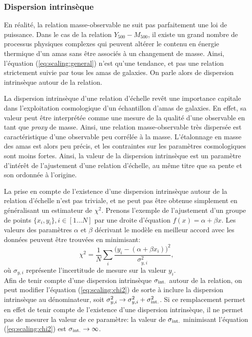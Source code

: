 \subsubsection{Dispersion intrinsèque} %
\label{sec:scaling:int_scat}

En réalité, la relation masse-observable ne suit pas parfaitement une loi de puissance.
Dans le cas de la relation $Y_{500} - M_{500}$, il existe un grand nombre de processus physiques complexes qui peuvent altérer le contenu en énergie thermique d'un amas sans être associés à un changement de masse.
Ainsi, l'équation (\ref{eq:scaling:general}) n'est qu'une tendance, et pas une relation strictement suivie par tous les amas de galaxies.
On parle alors de dispersion intrinsèque autour de la relation.

La dispersion intrinsèque d'une relation d'échelle revêt une importance capitale dans l'exploitation cosmologique d'un échantillon d'amas de galaxies.
En effet, sa valeur peut être interprétée comme une mesure de la qualité d'une observable en tant que \textit{proxy} de masse\footnotemark.
Ainsi, une relation masse-observable très dispersée est caractéristique d'une observable peu corrélée à la masse.
L'étalonnage en masse des amas est alors peu précis, et les contraintes sur les paramètres cosmologiques sont moins fortes.
Ainsi, la valeur de la dispersion intrinsèque est un paramètre d'intérêt de l'ajustement d'une relation d'échelle, au même titre que sa pente et son ordonnée à l'origine.

La prise en compte de l'existence d'une dispersion intrinsèque autour de la relation d'échelle n'est pas triviale, et ne peut pas être obtenue simplement en généralisant un estimateur de $\chi^2$.
Prenons l'exemple de l'ajustement d'un groupe de points $\{x_i, y_i\}, i \in [1\dots N]$ par une droite d'équation $f(x) = \alpha + \beta x$.
Les valeurs des paramètres $\alpha$ et $\beta$ décrivant le modèle en meilleur accord avec les données peuvent être trouvées en minimisant:
\begin{equation}
    \label{eq:scaling:chi2}
    \chi^2 = \frac{1}{N} \sum_i \frac{\big(y_i - (\alpha + \beta x_i) \big)^2}{\sigma_{y,i}^2},
\end{equation}
où $\sigma_{y, i}$ représente l'incertitude de mesure sur la valeur $y_i$. \\
Afin de tenir compte d'une dispersion intrinsèque $\sigma_{\rm int.}$ autour de la relation, on peut modifier l'équation (\ref{eq:scaling:chi2}) de sorte à inclure la dispersion intrinsèque au dénominateur, soit $\sigma_{y,i}^2 \rightarrow \sigma_{y,i}^2 + \sigma_{\rm int.}^2$.
Si ce remplacement permet en effet de tenir compte de l'existence d'une dispersion intrinsèque, il ne permet pas de mesurer la valeur de ce paramètre: la valeur de $\sigma_{\rm int.}$ minimisant l'équation (\ref{eq:scaling:chi2}) est $\sigma_{\rm int.} \rightarrow \infty$.

